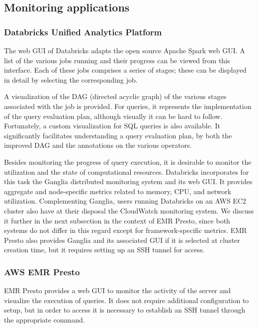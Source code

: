 \subsection{Monitoring applications}

\subsubsection{Databricks Unified Analytics Platform}

The web GUI of Databricks adapts the open source Apache Spark web GUI. A list of the various jobs running and their progress can be viewed from this interface. Each of these jobs comprises a series of stages; these can be displayed in detail by selecting the corresponding job.

A visualization of the DAG (directed acyclic graph) of the various stages associated with the job is provided. For queries, it represents the implementation of the query evaluation plan, although visually it can be hard to follow. Fortunately, a custom visualization for SQL queries is also available. It significantly facilitates understanding a query evaluation plan, by both the improved DAG and the annotations on the various operators.

Besides monitoring the progress of query execution, it is desirable to monitor the utilization and the state of computational resources. Databricks incorporates for this task the Ganglia distributed monitoring system and its web GUI. It provides aggregate and node-specific metrics related to memory, CPU, and network utilization. Complementing Ganglia, users running Databricks on an AWS EC2 cluster also have at their disposal the CloudWatch monitoring system. We discuss it further in the next subsection in the context of EMR Presto, since both systems do not differ in this regard except for framework-specific metrics. EMR Presto also provides Ganglia and its associated GUI if it is selected at cluster creation time, but it requires setting up an SSH tunnel for access.

\subsubsection{AWS EMR Presto}

EMR Presto provides a web GUI to monitor the activity of the server and visualize the execution of queries. It does not require additional configuration to setup, but in order to access it is necessary to establish an SSH tunnel through the appropriate command.

